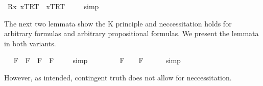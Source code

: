 \begin{isabellebody}
\ {\isachardoublequoteopen}{\isacharbrackleft}{\isacharparenleft}\isactrlbold {\isasymforall}R{\isachardot}\isactrlbold {\isasymforall}x{\isachardot}\ {\isasymlbrace}x\isactrlsup T{\isacharcomma}R\isactrlsup T{\isasymrbrace}\ \isactrlbold {\isasymrightarrow}\ {\isasymlbrace}x\isactrlsup T{\isacharcomma}R\isactrlsup T{\isasymrbrace}{\isacharparenright}{\isacharbrackright}\ {\isacharequal}\ {\isasymtop}{\isachardoublequoteclose}%
\isadelimproof
\ %
\endisadelimproof
%
\isatagproof
{}\isamarkupfalse%
\ simp%
\endisatagproof
{\isafoldproof}%
%
\isadelimproof
%
\endisadelimproof
%
\isamarkuptrue%
%
\begin{isamarkuptext}%
The next two lemmata show the K principle  and neccessitation holds for arbitrary formulas 
  and arbitrary propositional formulas. We present the lemmata in both variants.%
\end{isamarkuptext}\isamarkuptrue%
\ \isamarkupfalse%
\ {\isachardoublequoteopen}{\isacharbrackleft}{\isacharparenleft}\isactrlbold {\isasymbox}{\isacharparenleft}{\isasymphi}\isactrlsup F\ \isactrlbold {\isasymrightarrow}\ {\isasymphi}\isactrlsup F{\isacharparenright}{\isacharparenright}\ \isactrlbold {\isasymrightarrow}\ {\isacharparenleft}\isactrlbold {\isasymbox}{\isasymphi}\isactrlsup F\ \isactrlbold {\isasymrightarrow}\ \isactrlbold {\isasymbox}{\isasymphi}\isactrlsup F{\isacharparenright}{\isacharbrackright}\ {\isacharequal}\ {\isasymtop}{\isachardoublequoteclose}%
\isadelimproof
\ %
\endisadelimproof
%
\isatagproof
{}\isamarkupfalse%
\ simp\ \isamarkupfalse%
\ \ \ \ %
%
\endisatagproof
{\isafoldproof}%
%
\isadelimproof
%
\endisadelimproof
\isanewline
\isanewline
\ \isamarkupfalse%
\ {\isachardoublequoteopen}{\isacharbrackleft}{\isasymphi}\isactrlsup F{\isacharbrackright}\ {\isacharequal}\ {\isasymtop}\ {\isasymlongrightarrow}\ {\isacharbrackleft}\isactrlbold {\isasymbox}{\isasymphi}\isactrlsup F{\isacharbrackright}\ {\isacharequal}\ {\isasymtop}\ {\isachardoublequoteclose}%
\isadelimproof
\ %
\endisadelimproof
%
\isatagproof
{}\isamarkupfalse%
\ simp\ \isamarkupfalse%
\ \ \ \ %
%
\endisatagproof
{\isafoldproof}%
%
\isadelimproof
%
\endisadelimproof
%
\begin{isamarkuptext}%
However, as intended, contingent truth does not allow for neccessitation.%
\end{isamarkuptext}\isamarkuptrue%

\end{isabellebody}
